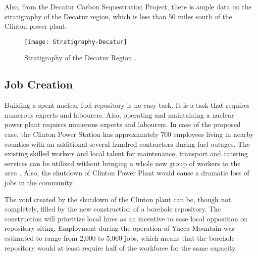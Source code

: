  \fi
  
  
  Also, from the Decatur Carbon Sequestration Project, there is ample data
  on the stratigraphy of the Decatur region, which is less than 50 miles south
  of the Clinton power plant.
 
  
  
  
\begin{figure}[!h] 
  \centering
  \texttt{[image: Stratigraphy-Decatur]}	
  \caption{Stratigraphy of the Decatur Region
  \cite{McDonald_2012}.}
  \label{fig:Stratigraphy}
\end{figure}
  



\subsection{Job Creation}



Building a spent nuclear fuel repository is no easy task. It is a task that requires
numerous experts and labourers. Also, operating and maintaining a nuclear power plant
requires numerous experts and labourers. In case of the proposed case, the Clinton
 Power Station has approximately 700 employees living in nearby counties with an
additional several hundred contractors during fuel outages\cite{Exelon}.
The existing skilled workers and local talent for maintenance, transport and catering
services can be utilized without bringing a whole new group of workers to the area \cite{IAEA_2008}. Also, the shutdown of Clinton Power Plant would cause a dramatic
loss of jobs in the community. 




The void created by the shutdown of the Clinton plant can be, though not
completely, filled by the new construction of a borehole repository. The construction
will prioritize local hires as an incentive to ease local opposition on repository
 siting. Employment during the operation of Yucca Mountain was estimated to range from
 2,000 to 5,000 jobs, \cite{Riddel_2003} which means that the borehole repository
 would at least require half of the workforce for the same capacity. 

